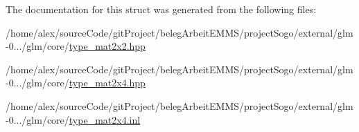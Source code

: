 The documentation for this struct was generated from the following files\-:\begin{DoxyCompactItemize}
\item 
/home/alex/source\-Code/git\-Project/beleg\-Arbeit\-E\-M\-M\-S/project\-Sogo/external/glm-\/0.../glm/core/\hyperlink{type__mat2x2_8hpp}{type\-\_\-mat2x2.\-hpp}\item 
/home/alex/source\-Code/git\-Project/beleg\-Arbeit\-E\-M\-M\-S/project\-Sogo/external/glm-\/0.../glm/core/\hyperlink{type__mat2x4_8hpp}{type\-\_\-mat2x4.\-hpp}\item 
/home/alex/source\-Code/git\-Project/beleg\-Arbeit\-E\-M\-M\-S/project\-Sogo/external/glm-\/0.../glm/core/\hyperlink{type__mat2x4_8inl}{type\-\_\-mat2x4.\-inl}\end{DoxyCompactItemize}

